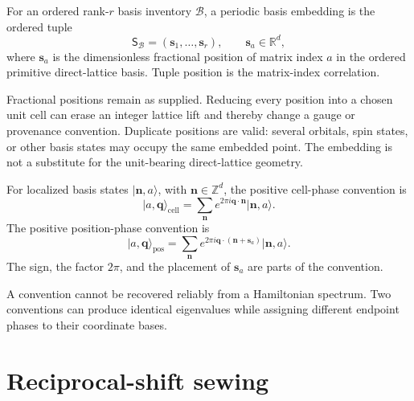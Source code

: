 \begin{definition}
\label{def:training-periodic-basis-embedding}
For an ordered rank-\(r\) basis inventory \(\mathcal B\), a periodic basis
embedding is the ordered tuple
\begin{equation}
  \mathsf S_{\mathcal B}
  =\left(\mathbf s_1,\ldots,\mathbf s_r\right),
  \qquad
  \mathbf s_a\in\mathbb R^d,
\end{equation}
where \(\mathbf s_a\) is the dimensionless fractional position of matrix index
\(a\) in the ordered primitive direct-lattice basis. Tuple position is the
matrix-index correlation.
\end{definition}

Fractional positions remain as supplied. Reducing every position into a chosen
unit cell can erase an integer lattice lift and thereby change a gauge or
provenance convention. Duplicate positions are valid: several orbitals, spin
states, or other basis states may occupy the same embedded point. The embedding
is not a substitute for the unit-bearing direct-lattice geometry.

\begin{definition}
\label{def:training-positive-bloch-conventions}
For localized basis states \(\lvert\mathbf n,a\rangle\), with
\(\mathbf n\in\mathbb Z^d\), the positive cell-phase convention is
\begin{equation}
  \lvert a,\mathbf q\rangle_{\mathrm{cell}}
  =\sum_{\mathbf n}
   e^{2\pi i\mathbf q\cdot\mathbf n}
   \lvert\mathbf n,a\rangle.
  \label{eq:training-cell-phase-bloch-sum}
\end{equation}
The positive position-phase convention is
\begin{equation}
  \lvert a,\mathbf q\rangle_{\mathrm{pos}}
  =\sum_{\mathbf n}
   e^{2\pi i\mathbf q\cdot(\mathbf n+\mathbf s_a)}
   \lvert\mathbf n,a\rangle.
  \label{eq:training-position-phase-bloch-sum}
\end{equation}
The sign, the factor \(2\pi\), and the placement of \(\mathbf s_a\) are parts
of the convention.
\end{definition}

A convention cannot be recovered reliably from a Hamiltonian spectrum. Two
conventions can produce identical eigenvalues while assigning different
endpoint phases to their coordinate bases.

\section{Reciprocal-shift sewing}

